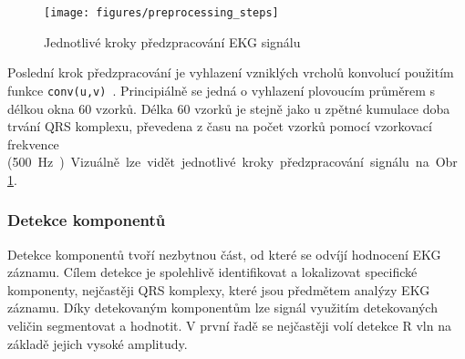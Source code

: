 \begin{figure}[h!]
    \begin{center}
        \texttt{[image: figures/preprocessing\_steps]}
        \caption{Jednotlivé kroky předzpracování EKG signálu}
        \label{fig:preprocessing_steps}
    \end{center}
\end{figure}

Poslední krok předzpracování je vyhlazení vzniklých vrcholů konvolucí použitím
funkce \texttt{conv(u,v)}~\cite{matlabCONV}. Principiálně se jedná o vyhlazení 
plovoucím průměrem s délkou okna 60 vzorků. Délka 60 vzorků je
stejně jako u zpětné kumulace doba trvání QRS komplexu, převedena z času na
počet vzorků pomocí vzorkovací frekvence (500~\si\Hz). Vizuálně lze vidět
jednotlivé kroky předzpracování signálu na Obr.~\ref{fig:preprocessing_steps}.

\subsubsection{Detekce komponentů}
\label{section:components_detection}
Detekce komponentů tvoří nezbytnou část, od které se odvíjí hodnocení EKG
záznamu. Cílem detekce je spolehlivě identifikovat a lokalizovat specifické
komponenty, nejčastěji QRS komplexy, které jsou předmětem analýzy EKG záznamu.
Díky detekovaným komponentům lze signál využitím detekovaných veličin
segmentovat a hodnotit. V první řadě se nejčastěji volí detekce R vln na základě
jejich vysoké amplitudy.


